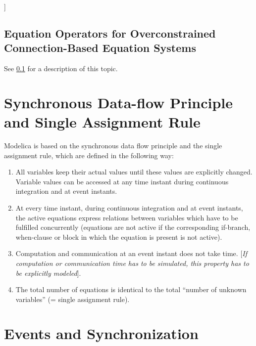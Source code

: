 \documentclass[10pt,a4paper]{report}
\def\doublelabel#1{\label{#1}}
\begin{document}
{]}

\subsection{Equation Operators for Overconstrained Connection-Based Equation Systems}\doublelabel{equation-operators-for-overconstrained-connection-based-equation-systems}

See \ref{equation-operators-for-overconstrained-connection-based-equation-systems} for a description of this topic.

\section{Synchronous Data-flow Principle and Single Assignment Rule}\doublelabel{synchronous-data-flow-principle-and-single-assignment-rule}

Modelica is based on the synchronous data flow principle and the single
assignment rule, which are defined in the following way:

\begin{enumerate}
\item All variables keep their actual values until these values are
explicitly changed. Variable values can be accessed at any time instant
during continuous integration and at event instants.

\item At every time instant, during continuous integration and at event
instants, the active equations express relations between variables which
have to be fulfilled concurrently (equations are not active if the
corresponding if-branch, when-clause or block in which the equation is
present is not active).

\item  Computation and communication at an event instant does not take time.
{[}\emph{If computation or communication time has to be simulated, this
property has to be explicitly modeled}{]}.

\item  The total number of equations is identical to the total ``number of
unknown variables'' (= single assignment rule).
\end{enumerate}

\section{Events and Synchronization}\doublelabel{events-and-synchronization}
\end{document}
